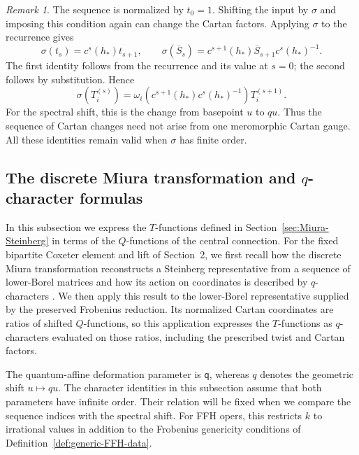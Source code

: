 \documentclass[11pt,leqno]{amsart}
\numberwithin{equation}{section}
\theoremstyle{plain}
\theoremstyle{definition}
\theoremstyle{plain}
\theoremstyle{definition}
\theoremstyle{remark}
\newtheorem{remark}[theorem]{Remark}
\newcommand{\qaff}{\mathsf q}
\begin{document}
\begin{remark}\label{rem:Cartan-sequence-basepoint}
The sequence is normalized by $t_0=1$. Shifting the input by $\sigma$ and imposing this condition again can change the Cartan factors. Applying $\sigma$ to the recurrence gives
\begin{equation}\label{eq:Cartan-sequence-basepoint}
 \sigma(t_s)=c^s(h_*)t_{s+1},\qquad
 \sigma(\overline S_s)
   =c^{s+1}(h_*)\overline S_{s+1}c^s(h_*)^{-1}.
\end{equation}
The first identity follows from the recurrence and its value at $s=0$; the second follows by substitution.  Hence
\begin{equation}\label{eq:theta-sequence-basepoint}
 \sigma(T_i^{(s)})
 =\omega_i\!\left(c^{s+1}(h_*)c^s(h_*)^{-1}\right)
     T_i^{(s+1)}.
\end{equation}
For the spectral shift, this is the change from basepoint $u$ to $qu$.  Thus the sequence of Cartan changes need not arise from one meromorphic Cartan gauge.  All these identities remain valid when $\sigma$ has finite order.
\end{remark}


\subsection{The discrete Miura transformation and \texorpdfstring{$q$}{q}-character formulas}\label{sec:consequences}
In this subsection we express the $T$-functions defined in Section~\ref{sec:Miura-Steinberg} in terms of the $Q$-functions of the central connection.  For the fixed bipartite Coxeter element and lift of Section~2, we first recall how the discrete Miura transformation reconstructs a Steinberg representative from a sequence of lower-Borel matrices and how its action on coordinates is described by $q$-characters \cite[Theorem~30]{FL2025}.  We then apply this result to the lower-Borel representative supplied by the preserved Frobenius reduction.  Its normalized Cartan coordinates are ratios of shifted $Q$-functions, so this application expresses the $T$-functions as $q$-characters evaluated on those ratios, including the prescribed twist and Cartan factors.

The quantum-affine deformation parameter is $\qaff$, whereas $q$ denotes the geometric shift $u\mapsto qu$.  The character identities in this subsection assume that both parameters have infinite order.  Their relation will be fixed when we compare the sequence indices with the spectral shift.  For FFH opers, this restricts $k$ to irrational values in addition to the Frobenius genericity conditions of Definition~\ref{def:generic-FFH-data}.
\end{document}
